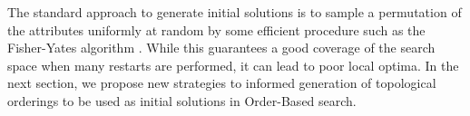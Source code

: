 The standard approach to generate initial solutions is to sample a permutation of the attributes uniformly at random by some efficient procedure such as the Fisher-Yates algorithm \cite{FisherYates98}. While this guarantees a good coverage of the search space when many restarts are performed, it can lead to poor local optima. In the next section, we propose new strategies to informed generation of topological orderings to be used as initial solutions in Order-Based search.
